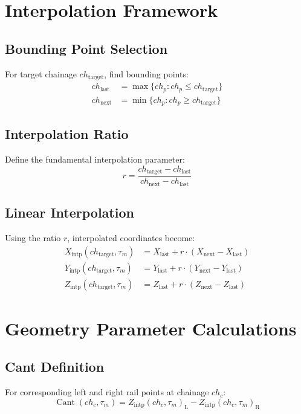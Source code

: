 \documentclass{article}
\DeclareMathOperator{\Cant}{Cant}
\newcommand{\time}[1]{\tau_{#1}}
\newcommand{\chainage}[1]{ch_{#1}}
\newcommand{\Xintp}[2]{X_{\text{intp}}(#1, #2)}
\newcommand{\Yintp}[2]{Y_{\text{intp}}(#1, #2)}
\newcommand{\Zintp}[2]{Z_{\text{intp}}(#1, #2)}
\newcommand{\Left}{\text{L}}
\newcommand{\Right}{\text{R}}
\begin{document}
\section{Interpolation Framework}

\subsection{Bounding Point Selection}
For target chainage $\chainage{\text{target}}$, find bounding points:
\begin{align}
\chainage{\text{last}} &= \max\{\chainage{p} : \chainage{p} \leq \chainage{\text{target}}\} \\
\chainage{\text{next}} &= \min\{\chainage{p} : \chainage{p} \geq \chainage{\text{target}}\}
\end{align}

\subsection{Interpolation Ratio}
Define the fundamental interpolation parameter:
\begin{equation}
r = \frac{\chainage{\text{target}} - \chainage{\text{last}}}{\chainage{\text{next}} - \chainage{\text{last}}}
\end{equation}

\subsection{Linear Interpolation}
Using the ratio $r$, interpolated coordinates become:
\begin{align}
\Xintp{\chainage{\text{target}}}{\time{m}} &= X_{\text{last}} + r \cdot (X_{\text{next}} - X_{\text{last}}) \\
\Yintp{\chainage{\text{target}}}{\time{m}} &= Y_{\text{last}} + r \cdot (Y_{\text{next}} - Y_{\text{last}}) \\
\Zintp{\chainage{\text{target}}}{\time{m}} &= Z_{\text{last}} + r \cdot (Z_{\text{next}} - Z_{\text{last}})
\end{align}

\section{Geometry Parameter Calculations}

\subsection{Cant Definition}
For corresponding left and right rail points at chainage $\chainage{c}$:
\begin{equation}
\Cant(\chainage{c}, \time{m}) = \Zintp{\chainage{c}}{\time{m}}_{\Left} - \Zintp{\chainage{c}}{\time{m}}_{\Right}
\end{equation}
\end{document}
